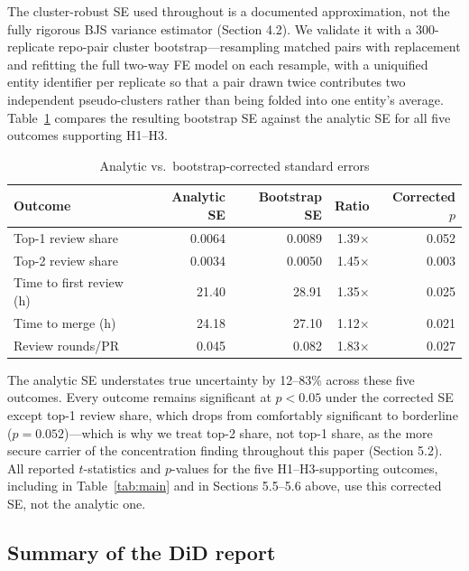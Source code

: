 \documentclass[12pt]{article}
\begin{document}
The cluster-robust SE used throughout is a documented approximation, not
the fully rigorous BJS variance estimator (Section 4.2). We validate it
with a 300-replicate repo-pair cluster bootstrap---resampling matched
pairs with replacement and refitting the full two-way FE model on each
resample, with a uniquified entity identifier per replicate so that a
pair drawn twice contributes two independent pseudo-clusters rather than
being folded into one entity's average. Table~\ref{tab:bootstrap}
compares the resulting bootstrap SE against the analytic SE for all five
outcomes supporting H1--H3.

\begin{table}[htbp]
\centering
\caption{Analytic vs.\ bootstrap-corrected standard errors}
\label{tab:bootstrap}
\small
\begin{tabular}{lrrrr}
\toprule
Outcome & Analytic SE & Bootstrap SE & Ratio & Corrected $p$ \\
\midrule
Top-1 review share       & 0.0064 & 0.0089 & 1.39$\times$ & 0.052 \\
Top-2 review share       & 0.0034 & 0.0050 & 1.45$\times$ & 0.003 \\
Time to first review (h) & 21.40  & 28.91  & 1.35$\times$ & 0.025 \\
Time to merge (h)        & 24.18  & 27.10  & 1.12$\times$ & 0.021 \\
Review rounds/PR         & 0.045  & 0.082  & 1.83$\times$ & 0.027 \\
\bottomrule
\end{tabular}
\end{table}

The analytic SE understates true uncertainty by 12--83\% across these
five outcomes. Every outcome remains significant at $p<0.05$ under the
corrected SE except top-1 review share, which drops from comfortably
significant to borderline ($p=0.052$)---which is why we treat top-2
share, not top-1 share, as the more secure carrier of the concentration
finding throughout this paper (Section 5.2). All reported $t$-statistics
and $p$-values for the five H1--H3-supporting outcomes, including in
Table~\ref{tab:main} and in Sections 5.5--5.6 above, use this corrected
SE, not the analytic one.

\subsection{Summary of the DiD report}
\end{document}
